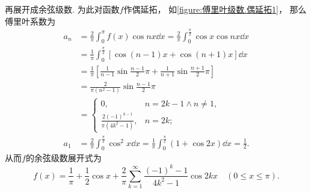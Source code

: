 \begin{example}
\begin{solution}
再展开成余弦级数.
为此对函数\(f\)作偶延拓，
如\cref{figure:傅里叶级数.偶延拓1}，
那么傅里叶系数为\begin{align*}
	a_n &= \frac{2}{\pi} \int_0^\pi f(x) \cos nx \dd{x}
	= \frac{2}{\pi} \int_0^{\frac{\pi}{2}} \cos x \cos nx \dd{x} \\
	&= \frac{1}{\pi} \int_0^{\frac{\pi}{2}} [\cos(n-1)x + \cos(n+1)x] \dd{x} \\
	&= \frac{1}{\pi} \left[
			\frac{1}{n-1} \sin\frac{n-1}{2}\pi
			+ \frac{1}{n+1} \sin\frac{n+1}{2}\pi
		\right] \\
	&= \frac{2}{\pi(n^2-1)} \sin\frac{n-1}{2}\pi \\
	&= \left\{ \begin{array}{cl}
		0, & n=2k-1 \land n\neq1, \\
		\frac{2(-1)^{k-1}}{\pi(4k^2-1)}, & n=2k;
	\end{array} \right. \\
	a_1 &= \frac{2}{\pi} \int_0^{\frac{\pi}{2}} \cos^2 x \dd{x}
	= \frac{1}{\pi} \int_0^{\frac{\pi}{2}} (1+\cos 2x) \dd{x}
	= \frac{1}{2}.
\end{align*}
从而\(f\)的余弦级数展开式为\begin{equation*}
	f(x) = \frac{1}{\pi} + \frac{1}{2} \cos x + \frac{2}{\pi}
		\sum_{k=1}^\infty \frac{(-1)^k-1}{4k^2-1} \cos 2kx
	\quad(0 \leq x \leq \pi).
\end{equation*}
\end{solution}
\end{example}

